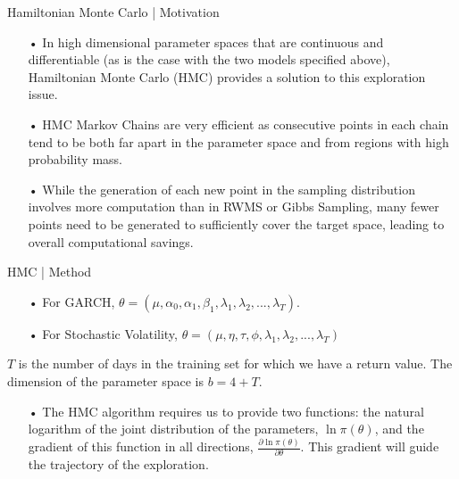 \documentclass[11pt]{beamer}
\begin{document}
\begin{frame}{Hamiltonian Monte Carlo | Motivation}
\begin{enumerate}
\item[•] In high dimensional parameter spaces that are continuous and differentiable (as is the case with the two models specified above), Hamiltonian Monte Carlo (HMC) provides a solution to this exploration issue. 
\item[•] HMC Markov Chains are very efficient as consecutive points in each chain tend to be both far apart in the parameter space and from regions with high probability mass.

\item[•] While the generation of each new point in the sampling distribution involves more computation than in RWMS or Gibbs Sampling, many fewer points need to be generated to sufficiently cover the target space, leading to overall computational savings.


\end{enumerate}

\end{frame}

\begin{frame}{HMC | Method}
\begin{enumerate}
\item[•]For GARCH, $\theta = (\mu, \alpha_0, \alpha_1, \beta_1, \lambda_1, \lambda_2, ... , \lambda_T)$.
\item[•]For Stochastic Volatility, $\theta = (\mu, \eta, \tau, \phi, \lambda_1, \lambda_2, ... , \lambda_T)$ 
\end{enumerate}

$T$ is the number of days in the training set for which we have a return value. The dimension of the parameter space is $b = 4 + T$.

\begin{enumerate}
\item[•]
The HMC algorithm requires us to provide two functions: the natural logarithm of the joint distribution of the parameters, $\ln\pi(\theta)$, and the gradient of this function in all directions, $\frac{\partial \ln\pi(\theta)}{\partial \theta}$. This gradient will guide the trajectory of the exploration. 
\end{enumerate}

\end{frame}
\end{document}
